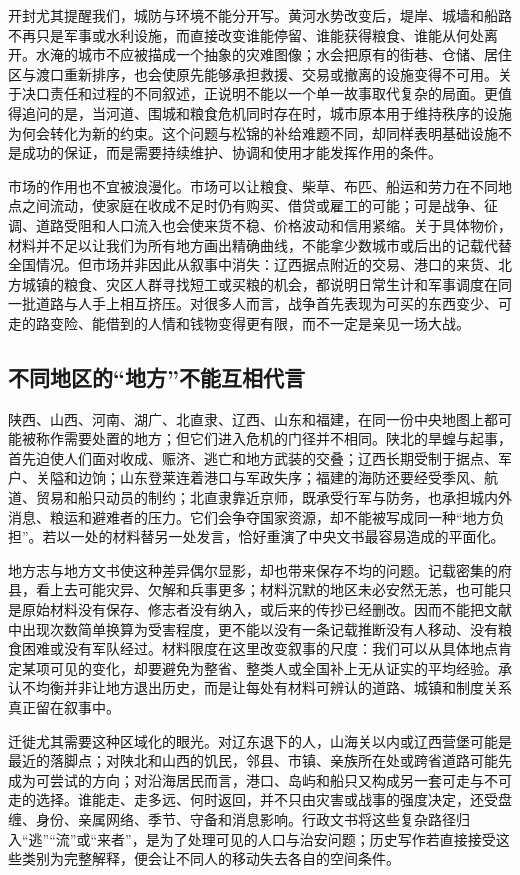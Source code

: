 开封尤其提醒我们，城防与环境不能分开写。黄河水势改变后，堤岸、城墙和船路不再只是军事或水利设施，而直接改变谁能停留、谁能获得粮食、谁能从何处离开。水淹的城市不应被描成一个抽象的灾难图像；水会把原有的街巷、仓储、居住区与渡口重新排序，也会使原先能够承担救援、交易或撤离的设施变得不可用。关于决口责任和过程的不同叙述，正说明不能以一个单一故事取代复杂的局面。更值得追问的是，当河道、围城和粮食危机同时存在时，城市原本用于维持秩序的设施为何会转化为新的约束。这个问题与松锦的补给难题不同，却同样表明基础设施不是成功的保证，而是需要持续维护、协调和使用才能发挥作用的条件。

市场的作用也不宜被浪漫化。市场可以让粮食、柴草、布匹、船运和劳力在不同地点之间流动，使家庭在收成不足时仍有购买、借贷或雇工的可能；可是战争、征调、道路受阻和人口流入也会使来货不稳、价格波动和信用紧缩。关于具体物价，材料并不足以让我们为所有地方画出精确曲线，不能拿少数城市或后出的记载代替全国情况。但市场并非因此从叙事中消失：辽西据点附近的交易、港口的来货、北方城镇的粮食、灾区人群寻找短工或买粮的机会，都说明日常生计和军事调度在同一批道路与人手上相互挤压。对很多人而言，战争首先表现为可买的东西变少、可走的路变险、能借到的人情和钱物变得更有限，而不一定是亲见一场大战。

\subsection{不同地区的“地方”不能互相代言}

陕西、山西、河南、湖广、北直隶、辽西、山东和福建，在同一份中央地图上都可能被称作需要处置的地方；但它们进入危机的门径并不相同。陕北的旱蝗与起事，首先迫使人们面对收成、赈济、逃亡和地方武装的交叠；辽西长期受制于据点、军户、关隘和边饷；山东登莱连着港口与军政失序；福建的海防还要经受季风、航道、贸易和船只动员的制约；北直隶靠近京师，既承受行军与防务，也承担城内外消息、粮运和避难者的压力。它们会争夺国家资源，却不能被写成同一种“地方负担”。若以一处的材料替另一处发言，恰好重演了中央文书最容易造成的平面化。

地方志与地方文书使这种差异偶尔显影，却也带来保存不均的问题。记载密集的府县，看上去可能灾异、欠解和兵事更多；材料沉默的地区未必安然无恙，也可能只是原始材料没有保存、修志者没有纳入，或后来的传抄已经删改。因而不能把文献中出现次数简单换算为受害程度，更不能以没有一条记载推断没有人移动、没有粮食困难或没有军队经过。材料限度在这里改变叙事的尺度：我们可以从具体地点肯定某项可见的变化，却要避免为整省、整类人或全国补上无从证实的平均经验。承认不均衡并非让地方退出历史，而是让每处有材料可辨认的道路、城镇和制度关系真正留在叙事中。

迁徙尤其需要这种区域化的眼光。对辽东退下的人，山海关以内或辽西营堡可能是最近的落脚点；对陕北和山西的饥民，邻县、市镇、亲族所在处或跨省道路可能先成为可尝试的方向；对沿海居民而言，港口、岛屿和船只又构成另一套可走与不可走的选择。谁能走、走多远、何时返回，并不只由灾害或战事的强度决定，还受盘缠、身份、亲属网络、季节、守备和消息影响。行政文书将这些复杂路径归入“逃”“流”或“来者”，是为了处理可见的人口与治安问题；历史写作若直接接受这些类别为完整解释，便会让不同人的移动失去各自的空间条件。

